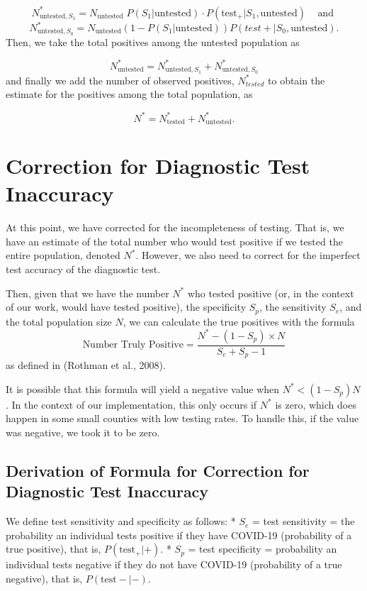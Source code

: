 \documentclass[12pt,twoside]{smiththesis}
\begin{document}
\[N^*_{\text{untested},S_1} = N_{\text{untested}} \; P(S_1|\text{untested}) \cdot P(\text{test}_+ | S_1,\text{untested}) \;\;\;\text{ and }\]
\[N^*_{\text{untested},S_0} = N_{\text{untested}}(1-P(S_1|\text{untested}))P(test + | S_0,\text{untested}).\]
Then, we take the total positives among the untested population as

\[N^*_{\text{untested}} = N^*_{\text{untested},S_1} + N^*_{\text{untested},S_0}\]
and finally we add the number of observed positives, \(N^*_{tested}\) to obtain the estimate for the positives among the total population, as

\[N^* = N^*_{\text{tested}} +N^*_{\text{untested}}.\]

\hypertarget{correct-test-inaccuracy}{%
\section{Correction for Diagnostic Test Inaccuracy}\label{correct-test-inaccuracy}}

At this point, we have corrected for the incompleteness of testing. That is, we have an estimate of the total number who would test positive if we tested the entire population, denoted \(N^*\). However, we also need to correct for the imperfect test accuracy of the diagnostic test.

Then, given that we have the number \(N^*\) who tested positive (or, in the context of our work, would have tested positive), the specificity \(S_p\), the sensitivity \(S_e\), and the total population size \(N\), we can calculate the true positives with the formula
\[\text{Number Truly Positive} = \dfrac{N^* - (1-S_p) \times N}{S_e+S_p-1}\]
as defined in (Rothman et al., 2008).

It is possible that this formula will yield a negative value when \(N^* < (1-S_p) N\). In the context of our implementation, this only occurs if \(N^*\) is zero, which does happen in some small counties with low testing rates. To handle this, if the value was negative, we took it to be zero.

\hypertarget{derivation-of-formula-for-correction-for-diagnostic-test-inaccuracy}{%
\subsection{Derivation of Formula for Correction for Diagnostic Test Inaccuracy}\label{derivation-of-formula-for-correction-for-diagnostic-test-inaccuracy}}

We define test sensitivity and specificity as follows:
* \(S_e\) = test sensitivity = the probability an individual tests positive if they have COVID-19 (probability of a true positive), that is, \(P(\text{test}_+ | +)\).
* \(S_p\) = test specificity = probability an individual tests negative if they do not have COVID-19 (probability of a true negative), that is, \(P(\text{test}- |-)\).
\end{document}
